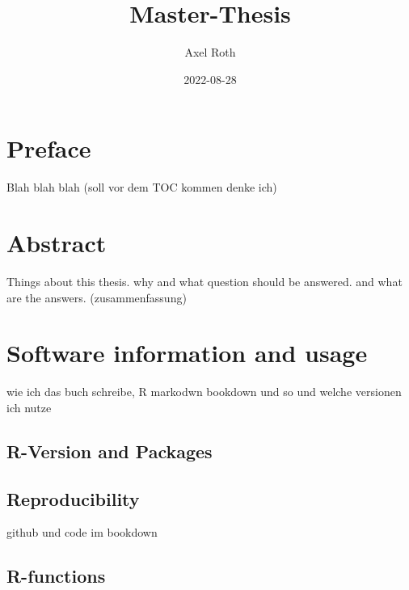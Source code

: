 \documentclass[
  oneside]{book}
\title{Master-Thesis}
\author{Axel Roth}
\date{2022-08-28}
\begin{document}
\maketitle

{
\setcounter{tocdepth}{1}
\tableofcontents
}
\hypertarget{preface}{%
\chapter*{Preface}\label{preface}}

\renewcommand{\chaptermark}[1]{\markboth{\uppercase{#1}}{\uppercase{#1}}}

Blah blah blah (soll vor dem TOC kommen denke ich)

\renewcommand{\chaptermark}[1]{\markboth{\uppercase{\thechapter. \ #1}}{}}

\hypertarget{abstract}{%
\chapter{Abstract}\label{abstract}}

Things about this thesis. why and what question should be answered. and what are the answers. (zusammenfassung)

\hypertarget{software-information-and-usage}{%
\chapter{Software information and usage}\label{software-information-and-usage}}

wie ich das buch schreibe, R markodwn bookdown und so und welche versionen ich nutze

\hypertarget{r-version-and-packages}{%
\section{R-Version and Packages}\label{r-version-and-packages}}

\hypertarget{reproducibility}{%
\section{Reproducibility}\label{reproducibility}}

github und code im bookdown

\hypertarget{r-functions}{%
\section{R-functions}\label{r-functions}}
\end{document}
